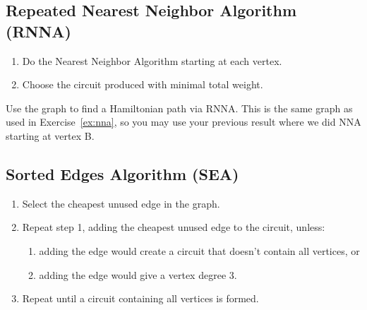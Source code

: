 \newpage

\subsection{Repeated Nearest Neighbor Algorithm (RNNA)}%
\label{sub:repeated-nearest-neighbor}

\begin{algorithm}
  \begin{enumerate}
  \item Do the Nearest Neighbor Algorithm starting at each vertex.
  \item Choose the circuit produced with minimal total weight.
  \end{enumerate}
\end{algorithm}

\begin{exercise}
  Use the graph to find a Hamiltonian path via RNNA. This is the same
  graph as used in Exercise~\ref{ex:nna}, so you may use your previous
  result where we did NNA starting at vertex B.


  

\end{exercise}

\newpage

\subsection{Sorted Edges Algorithm (SEA)}%
\label{sub:sorted-edges}

\begin{algorithm}
  \begin{enumerate}
  \item Select the cheapest unused edge in the graph.
  \item Repeat step 1, adding the cheapest unused edge to the circuit,
    unless:
    \begin{enumerate}
    \item adding the edge would create a circuit that doesn't contain
      all vertices, or
    \item adding the edge would give a vertex degree 3.
    \end{enumerate}
  \item Repeat until a circuit containing all vertices is formed.
  \end{enumerate}
\end{algorithm}


